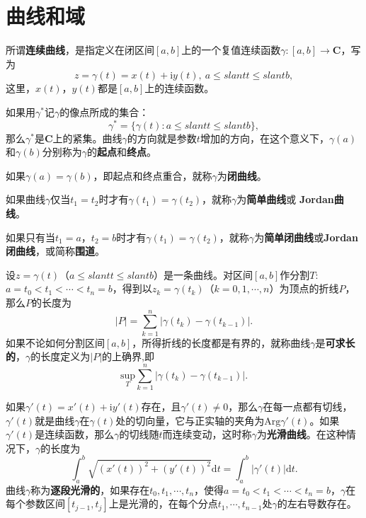 \documentclass[../../main.tex]{subfiles}
\begin{document}
\section{曲线和域}

\begin{definition}[连续曲线]
所谓\textbf{连续曲线}，是指定义在闭区间\([a, b]\)上的一个复值连续函数\(\gamma: [a, b] \to \mathbf{C}\)，写为
\[
z = \gamma(t) = x(t) + \mathrm{i}y(t), \ a \leqslant slant t \leqslant slant b,
\]
这里，\(x(t)\)，\(y(t)\)都是\([a, b]\)上的连续函数。

如果用\(\gamma^*\)记\(\gamma\)的像点所成的集合：
\[
\gamma^* = \{ \gamma(t) : a \leqslant slant t \leqslant slant b \},
\]
那么\(\gamma^*\)是\(\mathbf{C}\)上的紧集。曲线\(\gamma\)的方向就是参数\(t\)增加的方向，在这个意义下，\(\gamma(a)\)和\(\gamma(b)\)分别称为\(\gamma\)的\textbf{起点}和\textbf{终点}。

如果\(\gamma(a) = \gamma(b)\)，即起点和终点重合，就称\(\gamma\)为\textbf{闭曲线}。

如果曲线\(\gamma\)仅当\(t_1 = t_2\)时才有\(\gamma(t_1) = \gamma(t_2)\)，就称\(\gamma\)为\textbf{简单曲线}或 \textbf{Jordan曲线}。

如果只有当\(t_1 = a\)，\(t_2 = b\)时才有\(\gamma(t_1) = \gamma(t_2)\)，就称\(\gamma\)为\textbf{简单闭曲线}或\textbf{Jordan闭曲线}，或简称\textbf{围道}。
\end{definition}

\begin{definition}\label{definition:复平面上的光滑曲线}
设\(z = \gamma(t)\)（\(a \leqslant slant t \leqslant slant b\)）是一条曲线。对区间\([a, b]\)作分割$T:$ \(a = t_0 < t_1 < \cdots < t_n = b\)，得到以\(z_k = \gamma(t_k)\)（\(k = 0, 1, \cdots, n\)）为顶点的折线\(P\)，那么\(P\)的长度为
\[
|P| = \sum_{k = 1}^n | \gamma(t_k) - \gamma(t_{k - 1}) |.
\]
如果不论如何分割区间\([a, b]\)，所得折线的长度都是有界的，就称曲线\(\gamma\)是\textbf{可求长的}，\(\gamma\)的长度定义为\(|P|\)的上确界,即$$\underset{T}{\mathrm{sup}}\sum_{k=1}^n{|\gamma (t_k)}-\gamma (t_{k-1})|.$$

如果\(\gamma'(t) = x'(t) + \mathrm{i}y'(t)\)存在，且\(\gamma'(t) \neq 0\)，那么\(\gamma\)在每一点都有切线，\(\gamma'(t)\)就是曲线\(\gamma\)在\(\gamma(t)\)处的切向量，它与正实轴的夹角为\(\mathrm{Arg}\gamma'(t)\)。如果\(\gamma'(t)\)是连续函数，那么\(\gamma\)的切线随\(t\)而连续变动，这时称\(\gamma\)为\textbf{光滑曲线}。在这种情况下，\(\gamma\)的长度为
\[
\int_a^b \sqrt{(x'(t))^2 + (y'(t))^2} \mathrm{d}t = \int_a^b | \gamma'(t) | \mathrm{d}t.
\]
曲线\(\gamma\)称为\textbf{逐段光滑的}，如果存在\(t_0, t_1, \cdots, t_n\)，使得\(a = t_0 < t_1 < \cdots < t_n = b\)，\(\gamma\)在每个参数区间\([t_{j - 1}, t_j]\)上是光滑的，在每个分点\(t_1, \cdots, t_{n - 1}\)处\(\gamma\)的左右导数存在。
\end{definition}
\end{document}
